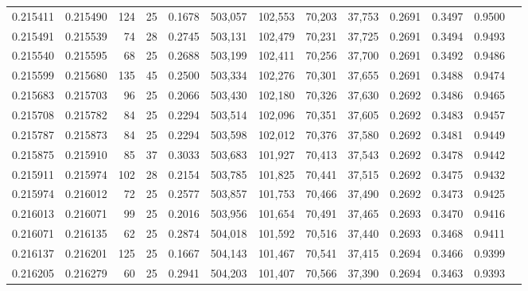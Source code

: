 \begin{tabular}{rrrrrrrrrrrrr}
0.215411 & 0.215490 & 124 &  25 &                                     0.1678 & 503,057 & 102,553 &  70,203 &  37,753 & 0.2691 & 0.3497 & 0.9500 \\
0.215491 & 0.215539 &  74 &  28 &                                     0.2745 & 503,131 & 102,479 &  70,231 &  37,725 & 0.2691 & 0.3494 & 0.9493 \\
0.215540 & 0.215595 &  68 &  25 &                                     0.2688 & 503,199 & 102,411 &  70,256 &  37,700 & 0.2691 & 0.3492 & 0.9486 \\
0.215599 & 0.215680 & 135 &  45 &                                     0.2500 & 503,334 & 102,276 &  70,301 &  37,655 & 0.2691 & 0.3488 & 0.9474 \\
0.215683 & 0.215703 &  96 &  25 &                                     0.2066 & 503,430 & 102,180 &  70,326 &  37,630 & 0.2692 & 0.3486 & 0.9465 \\
0.215708 & 0.215782 &  84 &  25 &                                     0.2294 & 503,514 & 102,096 &  70,351 &  37,605 & 0.2692 & 0.3483 & 0.9457 \\
0.215787 & 0.215873 &  84 &  25 &                                     0.2294 & 503,598 & 102,012 &  70,376 &  37,580 & 0.2692 & 0.3481 & 0.9449 \\
0.215875 & 0.215910 &  85 &  37 &                                     0.3033 & 503,683 & 101,927 &  70,413 &  37,543 & 0.2692 & 0.3478 & 0.9442 \\
0.215911 & 0.215974 & 102 &  28 &                                     0.2154 & 503,785 & 101,825 &  70,441 &  37,515 & 0.2692 & 0.3475 & 0.9432 \\
0.215974 & 0.216012 &  72 &  25 &                                     0.2577 & 503,857 & 101,753 &  70,466 &  37,490 & 0.2692 & 0.3473 & 0.9425 \\
0.216013 & 0.216071 &  99 &  25 &                                     0.2016 & 503,956 & 101,654 &  70,491 &  37,465 & 0.2693 & 0.3470 & 0.9416 \\
0.216071 & 0.216135 &  62 &  25 &                                     0.2874 & 504,018 & 101,592 &  70,516 &  37,440 & 0.2693 & 0.3468 & 0.9411 \\
0.216137 & 0.216201 & 125 &  25 &                                     0.1667 & 504,143 & 101,467 &  70,541 &  37,415 & 0.2694 & 0.3466 & 0.9399 \\
0.216205 & 0.216279 &  60 &  25 &                                     0.2941 & 504,203 & 101,407 &  70,566 &  37,390 & 0.2694 & 0.3463 & 0.9393 \\

\end{tabular}

